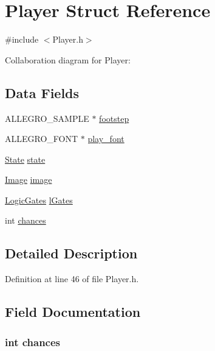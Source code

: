 \hypertarget{struct_player}{\section{Player Struct Reference}
\label{struct_player}
}


{\ttfamily \#include $<$Player.\-h$>$}



Collaboration diagram for Player\-:
\subsection*{Data Fields}
\begin{DoxyCompactItemize}
\item 
A\-L\-L\-E\-G\-R\-O\-\_\-\-S\-A\-M\-P\-L\-E $\ast$ \hyperlink{struct_player_aa7228d2fb7ab3cc3b4d35e4779a4d4c2}{footstep}
\item 
A\-L\-L\-E\-G\-R\-O\-\_\-\-F\-O\-N\-T $\ast$ \hyperlink{struct_player_a7ecd1e530b0530077cb42a66baa5c469}{play\-\_\-font}
\item 
\hyperlink{struct_state}{State} \hyperlink{struct_player_a876b486d3a5241a126bd5751c5f70f79}{state}
\item 
\hyperlink{struct_image}{Image} \hyperlink{struct_player_af6057c173c211ff78c0f66fe3229899e}{image}
\item 
\hyperlink{struct_logic_gates}{Logic\-Gates} \hyperlink{struct_player_ac73f56fdd711a88a042bdb7bb6279b56}{l\-Gates}
\item 
int \hyperlink{struct_player_a654217f8a02c11b0a494d8db3c912d7a}{chances}
\end{DoxyCompactItemize}


\subsection{Detailed Description}


Definition at line 46 of file Player.\-h.



\subsection{Field Documentation}
\hypertarget{struct_player_a654217f8a02c11b0a494d8db3c912d7a}{
\subsubsection[{chances}]{\setlength{\rightskip}{0pt plus 5cm}int chances}}\label{struct_player_a654217f8a02c11b0a494d8db3c912d7a}


